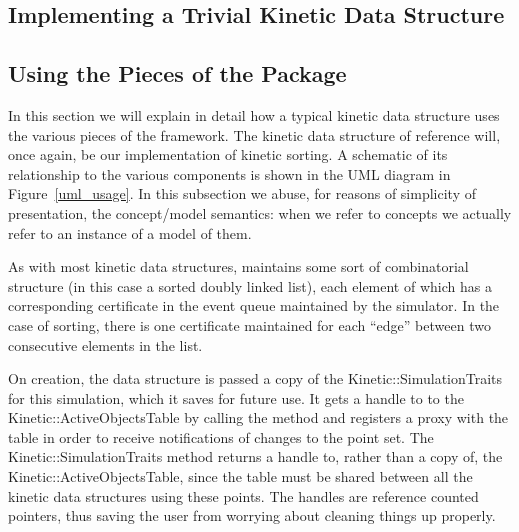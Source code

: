 
\subsection{Implementing a Trivial Kinetic Data Structure}
\label{sec:trivial_kds_example}

\subsection{Using the Pieces of the Package}

In this section we will explain in detail how a typical kinetic data
structure uses the various pieces of the framework. The kinetic data
structure of reference will, once again, be our implementation of
kinetic sorting.  A schematic of its relationship to the various
components is shown in the UML diagram in Figure~\ref{uml_usage}. In
this subsection we abuse, for reasons of simplicity of presentation,
the concept/model semantics: when we refer to concepts we actually
refer to an instance of a model of them.

As with most kinetic data structures,  maintains
some sort of combinatorial structure (in this case a sorted doubly linked list),
each element of which has a corresponding certificate in the event queue
maintained by the simulator. In the case of sorting, there is one
certificate maintained for each ``edge'' between two consecutive
elements in the list.

On creation, the data structure is passed a copy of the
Kinetic::SimulationTraits for this simulation, which it saves for
future use. It gets a handle to to the Kinetic::ActiveObjectsTable by
calling the
 method
and registers a proxy with the table in order to receive notifications
of changes to the point set.  The Kinetic::SimulationTraits method
returns a handle to, rather than a copy of, the
Kinetic::ActiveObjectsTable, since the table must be shared between
all the kinetic data structures using these points.  The handles are
reference counted pointers, thus saving the user from worrying about
cleaning things up properly.

